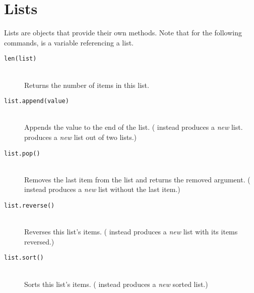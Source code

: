 \section{Lists}
Lists are objects that provide their own methods.
Note that for the following commands,  is a variable referencing a list.
\begin{description}
\item[\texttt{len(list)}] \hfill \\
	Returns the number of items in this list.
\item[\texttt{list.append(value)}] \hfill \\
	Appends the value to the end of the list.
( instead produces a \emph{new} list.  produces a \emph{new} list out of two lists.)
\item[\texttt{list.pop()}] \hfill \\
	Removes the last item from the list and returns the removed argument.
( instead produces a \emph{new} list without the last item.)
\item[\texttt{list.reverse()}] \hfill \\
	Reverses this list's items.
( instead produces a \emph{new} list with its items reversed.)
\item[\texttt{list.sort()}] \hfill \\
	Sorts this list's items.
( instead produces a \emph{new} sorted list.)
\end{description}

